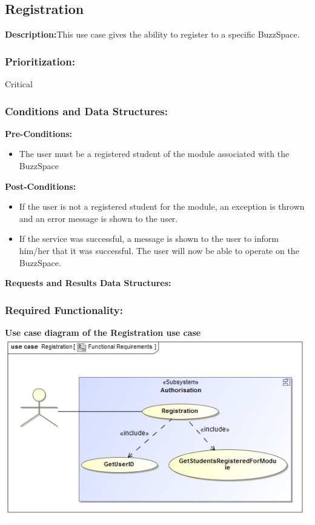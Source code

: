\documentclass[a4paper,11pt]{article}
\begin{document}
\subsection{Registration}
\textbf{Description:}This use case gives the ability to register to a specific BuzzSpace.
\subsubsection{Prioritization:} Critical
\subsubsection{Conditions and Data Structures:}
\textbf{Pre-Conditions:}
\begin{itemize}
	\item The user must be a registered student of the module associated with the BuzzSpace
\end{itemize}
\textbf{Post-Conditions:}
\begin{itemize}
	\item If the user is not a registered student for the module, an exception is thrown and an error message is shown to the user.
	\item If the service was successful, a message is shown to the user to inform him/her that it was successful. The user will now be able to operate on the BuzzSpace.
\end{itemize}
\textbf{Requests and Results Data Structures:}
\subsubsection{Required Functionality:} 
\textbf{Use case diagram of the Registration use case}\\
\includegraphics[width=1\linewidth]{./Images/Author/Registration.jpg}\\
\end{document}
